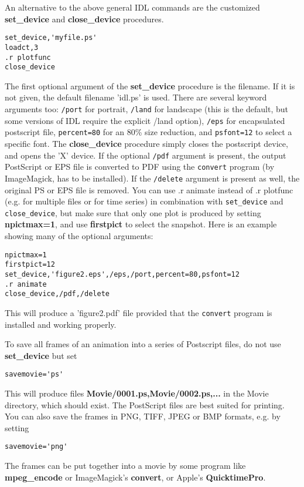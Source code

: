 An alternative to the above general IDL commands are  
the customized {\bf set\_device} and {\bf close\_device} procedures.
\begin{verbatim}
set_device,'myfile.ps'
loadct,3
.r plotfunc
close_device
\end{verbatim}
The first optional argument of the {\bf set\_device} procedure is the filename.
If it is not given, the default filename 'idl.ps' is used.
There are several keyword arguments too: {\tt /port} for
portrait, {\tt /land} for landscape (this is the default, but some
versions of IDL require the explicit /land option), 
{\tt /eps} for encapsulated postscript file, 
{\tt percent=80} for an 80\% size reduction, and {\tt psfont=12}
to select a specific font. The {\bf close\_device} procedure
simply closes the postscript device, and opens the 'X' device.
If the optional {\tt /pdf} argument is present, the output PostScript or EPS
file is converted to PDF using the {\tt convert} program (by ImageMagick,
has to be installed).
If the {\tt /delete} argument is present as well, the original PS or EPS file
is removed. 
You can use .r animate instead of .r plotfunc (e.g. for multiple files or 
for time series) in combination with {\tt set\_device} and 
{\tt close\_device}, but make sure that only one plot is produced by setting
{\bf npictmax=1}, and use {\bf firstpict} to select the snapshot.
Here is an example showing many of the optional arguments:
\begin{verbatim}
npictmax=1
firstpict=12
set_device,'figure2.eps',/eps,/port,percent=80,psfont=12
.r animate
close_device,/pdf,/delete
\end{verbatim}
This will produce a 'figure2.pdf' file provided that the {\tt convert} program
is installed and working properly.

To save all frames of an animation into a series of Postscript files, 
do not use {\bf set\_device} but set
\begin{verbatim}
savemovie='ps'
\end{verbatim}
This will produce files {\bf Movie/0001.ps,Movie/0002.ps,...} 
in the Movie directory, which should exist. The PostScript files 
are best suited for printing.
You can also save the frames in PNG, TIFF, JPEG or BMP formats, e.g.
by setting 
\begin{verbatim}
savemovie='png'
\end{verbatim}
The frames can be put together into a movie by some program like
{\bf mpeg\_encode} or ImageMagick's {\bf convert}, or 
Apple's {\bf QuicktimePro}. 

